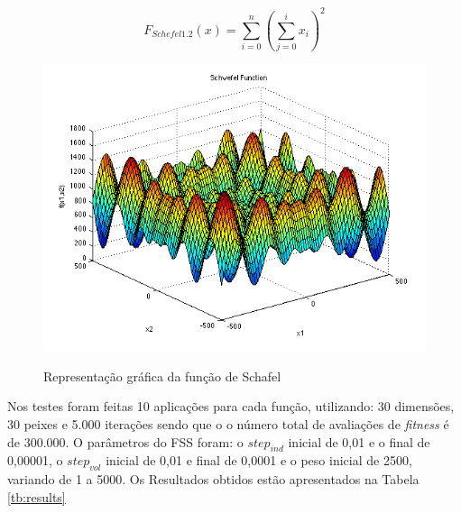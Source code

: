 \begin{equation}
\label{eq:schafel_12}
F_{Schefel 1.2}(x) = \sum_{i=0}^{n} \left(\sum_{j=0}^{i} x_i\right)^2
\end{equation}

\begin{figure}[!htb]
	\caption{Representação gráfica da função de Schafel}
	\centering
	\includegraphics[scale=0.3]{images/f_schafel.png}
	\label{fig:f_schafel}
\end{figure}

Nos testes foram feitas 10 aplicações para cada função, utilizando: 30 dimensões, 30 peixes e 5.000 iterações sendo que o o número total de avaliações de \textit{fitness} é de 300.000. O parâmetros do FSS foram: o $step_{ind}$ inicial de 0,01 e o final de 0,00001, o $step_{vol}$ inicial de 0,01 e final de 0,0001 e o peso inicial de 2500, variando de 1 a 5000. Os Resultados obtidos estão apresentados na Tabela \ref{tb:results}
	
